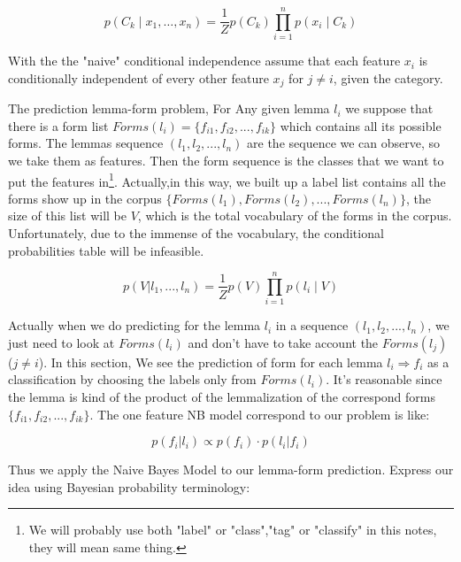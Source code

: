 \documentclass[a4paper]{article}
\begin{document}
{\[p(C_{k}\mid x_{1},\dots ,x_{n})={\frac {1}{Z}}p(C_{k})\prod _{i=1}^{n}p(x_{i}\mid C_{k})\]

With the the "naive" conditional independence assume that each feature $x_{i}$ is conditionally independent of every other feature $x_{j}$ for $j \neq i$, given the category. 

The prediction lemma-form problem, For Any given lemma $l_i$ we suppose that there is a form list $Forms(l_i)=\{f_{i1},f_{i2},...,f_{ik}\}$ which contains all its possible forms. The lemmas sequence $(l_1,l_2,...,l_n)$ are the sequence we can observe, so we take them as features. Then the form sequence is the classes that we want to put the features in\footnote{We will probably use both "label" or "class","tag" or "classify" in this notes, they will mean same thing.}. Actually,in this way,  we built up a label list contains all the forms show up in the corpus $\{Forms(l_1),Forms(l_2),..., Forms(l_n)\}$, the size of this list will be $V$, which is the total vocabulary of the forms in the corpus. Unfortunately, due to the immense of the vocabulary, the conditional probabilities table will be infeasible.

\[p(V|l_1,...,l_n) = \frac{1}{Z} p(V) \prod _{i=1}^{n}p(l_i \mid V) \]

Actually when we do predicting for the lemma $l_i$ in a sequence $(l_1,l_2,...,l_n)$, we just need to look at $Forms(l_i)$ and don't have to take account the $Forms(l_j)$ ($j \neq i$). In this section, We see the prediction of form for each lemma $l_i  \Longrightarrow f_i$ as a classification by choosing the labels only from $Forms(l_i)$. It's reasonable since the lemma is kind of the product of the lemmalization of the correspond forms $\{f_{i1},f_{i2},...,f_{ik}\}$. The one feature NB model correspond to our problem is like:

\[p(f_i|l_i) \propto p(f_i) \cdot  p(l_i|f_i)\]

Thus we apply the Naive Bayes Model to our lemma-form prediction. Express our idea using Bayesian probability terminology:

}
\end{document}
